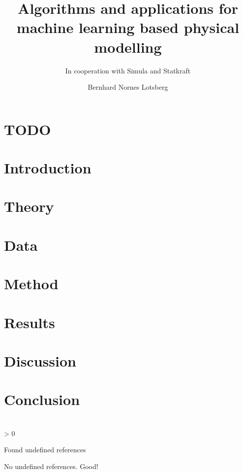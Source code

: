 \documentclass[a4paper,english]{report}
\title{Algorithms and applications for machine learning based physical modelling}
\subtitle{In cooperation with Simula and Statkraft}
\author{Bernhard Nornes Lotsberg}
\newcounter{undefinedreferences}
\newcommand{\checkreferences}{
	\ifnum\value{undefinedreferences} > 0
	\begin{center}
	\begin{Huge}
	Found undefined references
	\end{Huge}
	\end{center}
	\else
	No undefined references. Good!
	\fi
}
\begin{document}
\duoforside[
    dept={Department of Physics},
    program={Computational Science: physics},
    long]

\chapter{TODO}


\tableofcontents
\chapter{Introduction}


\newpage
\chapter{Theory}


\newpage
\chapter{Data}


\newpage
\chapter{Method}
\label{Data}


\newpage
\chapter{Results} 


\newpage
\chapter{Discussion}


\newpage
\chapter{Conclusion}

\nocite{lstm_first_paper}
\nocite{lstm_second_paper}
\nocite{lstm_third_paper}
\nocite{scikit-learn}




\newpage
\appendix
\chapter{}

\checkreferences
\end{document}
